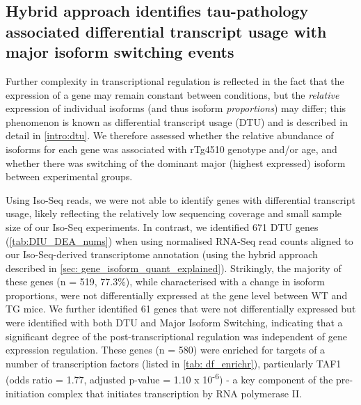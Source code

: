 \clearpage
\subsection{Hybrid approach identifies tau-pathology associated differential transcript usage with major isoform switching events}
Further complexity in transcriptional regulation is reflected in the fact that the expression of a gene may remain constant between conditions, but the \textit{relative} expression of individual isoforms (and thus isoform \textit{proportions}) may differ; this phenomenon is known as differential transcript usage (DTU) and is described in detail in \cref{intro:dtu}. We therefore assessed whether the relative abundance of isoforms for each gene was associated with rTg4510 genotype and/or age, and whether there was switching of the dominant major (highest expressed) isoform between experimental groups. 

Using Iso-Seq reads, we were not able to identify genes with differential transcript usage, likely reflecting the relatively low sequencing coverage and small sample size of our Iso-Seq experiments. In contrast, we identified 671 DTU genes (\cref{tab:DIU_DEA_nums}) when using normalised RNA-Seq read counts aligned to our Iso-Seq-derived transcriptome annotation (using the hybrid approach described in \cref{sec: gene_isoform_quant_explained}). Strikingly, the majority of these genes (n = 519, 77.3\%), while characterised with a change in isoform proportions, were not differentially expressed at the gene level between WT and TG mice. We further identified 61 genes that were not differentially expressed but were identified with both DTU and Major Isoform Switching, indicating that a significant degree of the post-transcriptional regulation was independent of gene expression regulation. These genes (n = 580) were enriched for targets of a number of transcription factors (listed in \cref{tab: df_enrichr}), particularly TAF1 (odds ratio = 1.77, adjusted p-value = 1.10 x 10\textsuperscript{-6}) - a key component of the pre-initiation complex that initiates transcription by RNA polymerase II\cite{Bieniossek2013}. 

